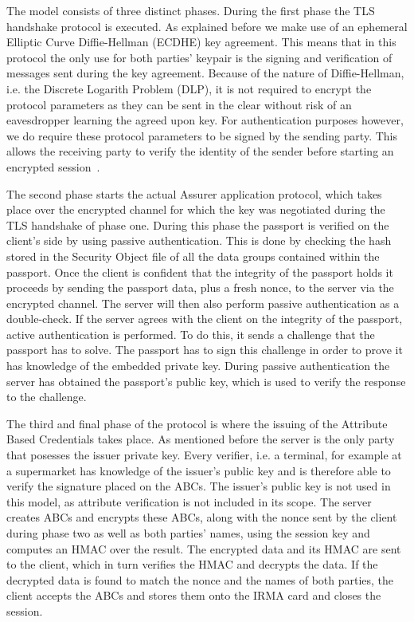 The model consists of three distinct phases. During the first phase the TLS handshake protocol is executed. As explained before we make use of an ephemeral Elliptic Curve Diffie-Hellman (ECDHE) key agreement. This means that in this protocol the only use for both parties' keypair is the signing and verification of messages sent during the key agreement. Because of the nature of Diffie-Hellman, i.e. the Discrete Logarith Problem (DLP), it is not required to encrypt the protocol parameters as they can be sent in the clear without risk of an eavesdropper learning the agreed upon key. For authentication purposes however, we do require these protocol parameters to be signed by the sending party. This allows the receiving party to verify the identity of the sender before starting an encrypted session~\cite{tls1.2,tlsecc}.

The second phase starts the actual Assurer application protocol, which takes place over the encrypted channel for which the key was negotiated during the TLS handshake of phase one. During this phase the passport is verified on the client's side by using passive authentication. This is done by checking the hash stored in the Security Object file of all the data groups contained within the passport. Once the client is confident that the integrity of the passport holds it proceeds by sending the passport data, plus a fresh nonce, to the server via the encrypted channel. The server will then also perform passive authentication as a double-check. If the server agrees with the client on the integrity of the passport, active authentication is performed. To do this, it sends a challenge that the passport has to solve. The passport has to sign this challenge in order to prove it has knowledge of the embedded private key. During passive authentication the server has obtained the passport's public key, which is used to verify the response to the challenge.

The third and final phase of the protocol is where the issuing of the Attribute Based Credentials takes place. As mentioned before the server is the only party that posesses the issuer private key. Every verifier, i.e. a terminal, for example at a supermarket has knowledge of the issuer's public key and is therefore able to verify the signature placed on the ABCs. The issuer's public key is not used in this model, as attribute verification is not included in its scope. The server creates ABCs and encrypts these ABCs, along with the nonce sent by the client during phase two as well as both parties' names, using the session key and computes an HMAC over the result. The encrypted data and its HMAC are sent to the client, which in turn verifies the HMAC and decrypts the data. If the decrypted data is found to match the nonce and the names of both parties, the client accepts the ABCs and stores them onto the IRMA card and closes the session.


